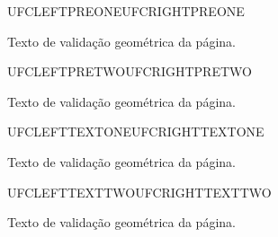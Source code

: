\documentclass{abntexto-ufc}
\newcommand{\geometriapagina}[1]{%
  \noindent UFCLEFT#1\hfill UFCRIGHT#1\par
  \vspace{2\baselineskip}
  Texto de validação geométrica da página.
}
\begin{document}
\pretextual
\geometriapagina{PREONE}
\newpage
\geometriapagina{PRETWO}

\textual
\geometriapagina{TEXTONE}
\newpage
\geometriapagina{TEXTTWO}
\end{document}
